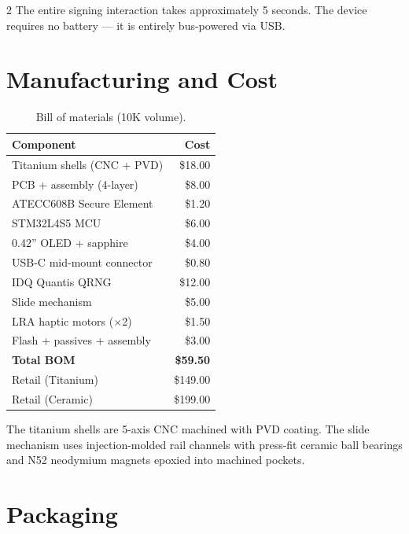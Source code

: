 \documentclass[11pt,a4paper]{article}
\begin{document}
\begin{multicols}{2}
The entire signing interaction takes approximately 5 seconds.
The device requires no battery --- it is entirely bus-powered via USB.

\section{Manufacturing and Cost}

\begin{table}[H]
  \centering
  \small
  \caption{Bill of materials (10K volume).}
  \label{tab:bom}
  \begin{tabular}{lr}
    \toprule
    \textbf{Component} & \textbf{Cost} \\
    \midrule
    Titanium shells (CNC + PVD)   & \$18.00 \\
    PCB + assembly (4-layer)       & \$8.00 \\
    ATECC608B Secure Element       & \$1.20 \\
    STM32L4S5 MCU                  & \$6.00 \\
    0.42'' OLED + sapphire         & \$4.00 \\
    USB-C mid-mount connector      & \$0.80 \\
    IDQ Quantis QRNG               & \$12.00 \\
    Slide mechanism                & \$5.00 \\
    LRA haptic motors ($\times$2)   & \$1.50 \\
    Flash + passives + assembly    & \$3.00 \\
    \midrule
    \textbf{Total BOM}             & \textbf{\$59.50} \\
    \midrule
    Retail (Titanium)              & \$149.00 \\
    Retail (Ceramic)               & \$199.00 \\
    \bottomrule
  \end{tabular}
\end{table}

The titanium shells are 5-axis CNC machined with PVD coating.
The slide mechanism uses injection-molded rail channels
with press-fit ceramic ball bearings and N52 neodymium magnets epoxied
into machined pockets.

\section{Packaging}


\end{multicols}
\end{document}
